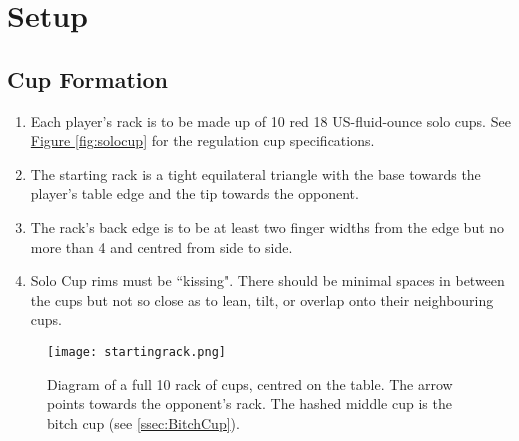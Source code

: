 \section{Setup}\label{sec:SETUP}
	\subsection{Cup Formation}\label{ssec:CupFormation}
		\begin{enumerate}[label=(\roman*)]
            \item \label{sssec:CF,solocups} Each player's rack is to be made up of 10 red 18 US-fluid-ounce solo cups.
                See \hyperref[fig:solocup]{Figure \ref{fig:solocup}} for the regulation cup specifications. 
            \item \label{sssec:CF,triangle} The starting rack is a tight equilateral triangle with the base towards the player's table edge and the tip towards the opponent. 
            \item \label{sssec:CF,position} The rack's back edge is to be at least two finger widths from the edge but no more than 4 and centred from side to side. 
            \item \label{sssec:CF,kissing} Solo Cup rims must be ``kissing". There should be minimal spaces in between the cups but not so close as to lean, tilt, or overlap onto their neighbouring cups. 
        \end{enumerate}
        \begin{figure}[H]%
            \centering
            \texttt{[image: startingrack.png]}
            \caption{Diagram of a full 10 rack of cups, centred on the table. The arrow points towards the opponent's rack. The hashed middle cup is the bitch cup (see \ref{ssec:BitchCup}).}
            \label{fig:therack}
        \end{figure}
